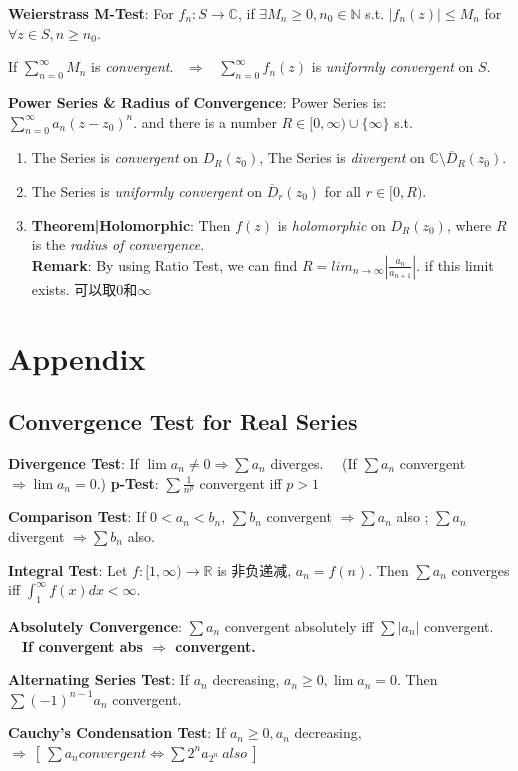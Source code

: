 \documentclass[9pt]{article}
\begin{document}
\textbf{Weierstrass M-Test}: For $f_n:S\to\mathbb{C}$, if $\exists M_n\geq 0,n_0\in\mathbb{N}$ s.t. $|f_n(z)|\leq M_n$ for $\forall z\in S,n\geq n_0$. 

\hspace{156pt}If $\sum^\infty_{n=0}M_n$ is \textit{convergent}. \ $\Rightarrow$ \ $\sum^\infty_{n=0}f_n(z)$ is \textit{uniformly convergent} on $S$.

\textbf{Power Series \& Radius of Convergence}: Power Series is: $\sum^\infty_{n=0}a_n(z-z_0)^n$. \quad and there is a number $R\in[0,\infty)\cup\{\infty\}$ s.t.

\begin{enumerate}[itemsep=-2pt, topsep=-2pt]
    \item The Series is \textit{convergent} on $D_{R}(z_0)$, \qquad\qquad\qquad\qquad\qquad\qquad The Series is \textit{divergent} on $\mathbb{C}\setminus \overline{D}_{R}(z_0)$.
    \item The Series is \textit{uniformly convergent} on $\overline{D}_{r}(z_0)$ for all $r\in[0,R)$.
    \item \textbf{Theorem|Holomorphic}: Then $f(z)$ is \textit{holomorphic} on $D_{R}(z_0)$, where $R$ is the \textit{radius of convergence}. \\
    \textbf{Remark}: By using Ratio Test, we can find $R=lim_{n\to\infty}\left|\frac{a_n}{a_{n+1}}\right|$. {\scriptsize if this limit exists. 可以取0和$\infty$}
\end{enumerate}


\section{Appendix}

\subsection{Convergence Test for Real Series} %

\textbf{Divergence Test}: If $\lim a_n\ne 0 \Rightarrow \sum a_n$ diverges. \ \ (If $\sum a_n$ convergent $\Rightarrow \lim a_n=0.$) \qquad \textbf{p-Test}: $\sum \frac{1}{n^p}$ convergent iff $p>1$

\textbf{Comparison Test}: If $0<a_n<b_n$, $\sum b_n$ convergent $\Rightarrow \sum a_n$ also ; $\sum a_n$ divergent $\Rightarrow \sum b_n$ also.

\textbf{Integral Test}: Let $f:[1,\infty)\rightarrow\mathbb{R}$ is 非负递减, $a_n=f(n)$. Then $\sum a_n$ converges iff $\int_{1}^{\infty}f(x)dx<\infty.$

\textbf{Absolutely Convergence}: $\sum a_n$ convergent absolutely iff $\sum |a_n|$ convergent. \ \ \textbf{If convergent abs $\Rightarrow$ convergent.}

\textbf{Alternating Series Test}: If $a_n$ decreasing, $a_n\geq 0,\lim a_n = 0$. Then $\sum (-1)^{n-1}a_n$ convergent.

\textbf{Cauchy's Condensation Test}: If $a_n\geq 0,a_n$ decreasing, $\Rightarrow \ [\ \sum a_n convergent \Leftrightarrow \sum 2^na_{2^n} \ also \ ]$
\end{document}
